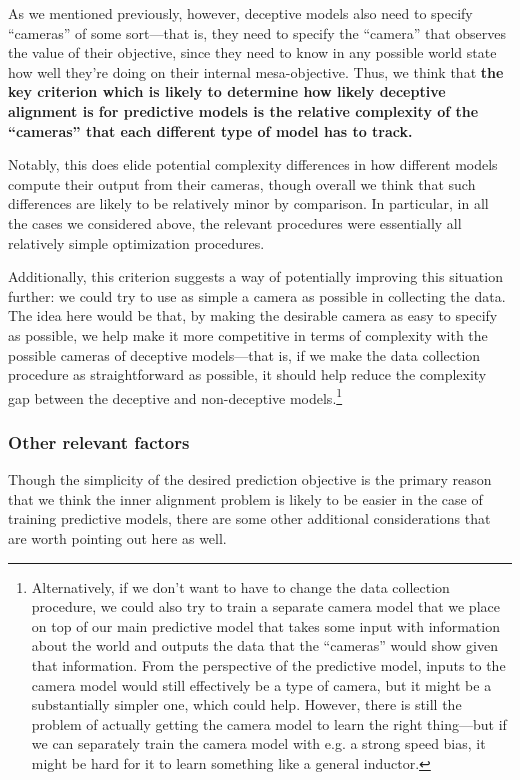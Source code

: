 \documentclass[
  onecolumn,
  natbib,
]{miri-tech-article}
\begin{document}
As we mentioned previously, however, deceptive models also need to specify ``cameras'' of some sort---that is, they need to specify the ``camera'' that observes the value of their objective, since they need to know in any possible world state how well they're doing on their internal mesa-objective. Thus, we think that \textbf{the key criterion which is likely to determine how likely deceptive alignment is for predictive models is the relative complexity of the ``cameras'' that each different type of model has to track.}

Notably, this does elide potential complexity differences in how different models compute their output from their cameras, though overall we think that such differences are likely to be relatively minor by comparison. In particular, in all the cases we considered above, the relevant procedures were essentially all relatively simple optimization procedures.

Additionally, this criterion suggests a way of potentially improving this situation further: we could try to use as simple a camera as possible in collecting the data. The idea here would be that, by making the desirable camera as easy to specify as possible, we help make it more competitive in terms of complexity with the possible cameras of deceptive models---that is, if we make the data collection procedure as straightforward as possible, it should help reduce the complexity gap between the deceptive and non-deceptive models.\footnote{Alternatively, if we don't want to have to change the data collection procedure, we could also try to train a separate camera model that we place on top of our main predictive model that takes some input with information about the world and outputs the data that the ``cameras'' would show given that information. From the perspective of the predictive model, inputs to the camera model would still effectively be a type of camera, but it might be a substantially simpler one, which could help. However, there is still the problem of actually getting the camera model to learn the right thing---but if we can separately train the camera model with e.g. a strong speed bias, it might be hard for it to learn something like a general inductor.}


\subsubsection{Other relevant factors}

Though the simplicity of the desired prediction objective is the primary reason that we think the inner alignment problem is likely to be easier in the case of training predictive models, there are some other additional considerations that are worth pointing out here as well.
\end{document}
